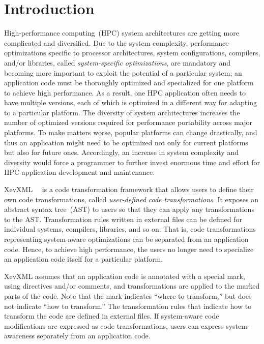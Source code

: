 \chapter{Introduction}\label{cap:intro}

High-performance computing~(HPC) system architectures are getting more
complicated and diversified. Due to the system complexity, performance
optimizations specific to processor architectures, system
configurations, compilers, and/or libraries, called
\emph{system-specific optimizations}, are mandatory and becoming more
important to exploit the potential of a particular system; an
application code must be thoroughly optimized and specialized for one
platform to achieve high performance.  As a result, one HPC application
often needs to have multiple versions, each of which is optimized in a
different way for adapting to a particular platform.  The diversity of
system architectures increases the number of optimized versions required
for performance portability across major platforms.  To make matters
worse, popular platforms can change drastically, and thus an application
might need to be optimized not only for current platforms but also for
future ones.  Accordingly, an increase in system complexity and
diversity would force a programmer to further invest enormous time and
effort for HPC application development and maintenance.



XevXML~\cite{xevxml-hipc}~\cite{xevxml-sc13} is a code transformation
framework that allows users to define their own code transformations,
called \emph{user-defined code transformations}.  It exposes an
abstract syntax tree~(AST) to users so that they can apply any
transformations to the AST. Transformation rules written in external
files can be defined for individual systems, compilers, libraries, and
so on.  That is, code transformations representing system-aware
optimizations can be separated from an application code.  Hence, to
achieve high performance, the users no longer need to specialize an
application code itself for a particular platform.

XevXML assumes that an application code is annotated with a special
mark, using directives and/or comments, and transformations are applied
to the marked parts of the code.  Note that the mark indicates ``where
to transform,'' but does not indicate ``how to transform.''  The
transformation rules that indicate how to transform the code are defined
in external files. If system-aware code modifications are expressed as
code transformations, users can express system-awareness separately from
an application code.

